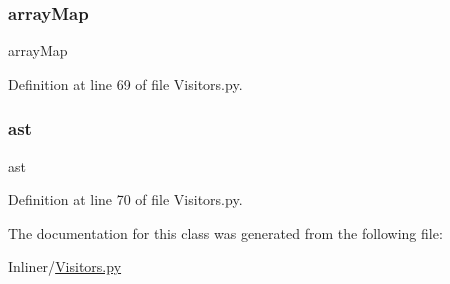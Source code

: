 \subsubsection{\texorpdfstring{array\+Map}{arrayMap}}
{\footnotesize\ttfamily array\+Map}



Definition at line 69 of file Visitors.\+py.

\mbox{\label{classVisitors_1_1DeclVisitor_a83d838e3813fb5999c0492e0d9474bd9}} 
\subsubsection{\texorpdfstring{ast}{ast}}
{\footnotesize\ttfamily ast}



Definition at line 70 of file Visitors.\+py.



The documentation for this class was generated from the following file\+:\begin{DoxyCompactItemize}
\item 
Inliner/\hyperlink{Visitors_8py}{Visitors.\+py}\end{DoxyCompactItemize}

